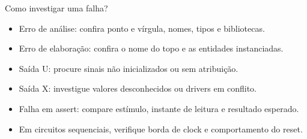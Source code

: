 \begin{frame}[t]{Como investigar uma falha?}
\begin{itemize}
\item Erro de análise: confira ponto e vírgula, nomes, tipos e bibliotecas.
\item Erro de elaboração: confira o nome do topo e as entidades instanciadas.
\item Saída U: procure sinais não inicializados ou sem atribuição.
\item Saída X: investigue valores desconhecidos ou drivers em conflito.
\item Falha em assert: compare estímulo, instante de leitura e resultado esperado.
\item Em circuitos sequenciais, verifique borda de clock e comportamento do reset.
\end{itemize}
\end{frame}
